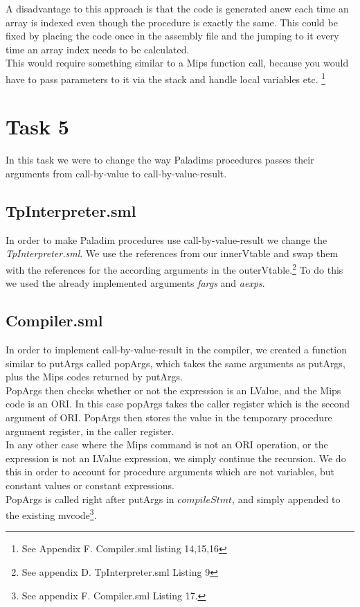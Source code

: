 \documentclass[12pt,a4paper,english]{article}
\begin{document}
A disadvantage to this approach is that the code is generated anew each time an array is indexed even though the procedure is exactly the same. This could be fixed by placing the code once in the assembly file and the jumping to it every time an array index needs to be calculated. \\
This would require something similar to a Mips function call, because you would have to pass parameters to it via the stack and handle local variables etc. 
\footnote{See Appendix F. Compiler.sml listing 14,15,16}

\section{Task 5}
In this task we were to change the way Paladims procedures passes their arguments from call-by-value to call-by-value-result.
\subsection{TpInterpreter.sml}
In order to make Paladim procedures use call-by-value-result we change the \textit{TpInterpreter.sml}. We use the references from our innerVtable and swap them with the references for the according arguments in the outerVtable.\footnote{See appendix D. TpInterpreter.sml Listing 9} To do this we used the already implemented arguments \textit{fargs} and \textit{aexps}.

\subsection{Compiler.sml}
In order to implement call-by-value-result in the compiler, we created a function similar to putArgs called popArgs, which takes the same arguments as putArgs, plus the Mips codes returned by putArgs. \\
PopArgs then checks whether or not the expression is an LValue, and the Mips code is an ORI. In this case popArgs takes the caller register which is the second argument of ORI. PopArgs then stores the value in the temporary procedure argument register, in the caller register. \\
In any other case where the Mips command is not an ORI operation, or the expression is not an LValue expression, we simply continue the recursion. We do this in order to account for procedure arguments which are not variables, but constant values or constant expressions. \\

PopArgs is called right after putArgs in $compileStmt$, and simply appended to the existing mvcode\footnote{See appendix F. Compiler.sml Listing 17.}.\\
\end{document}

